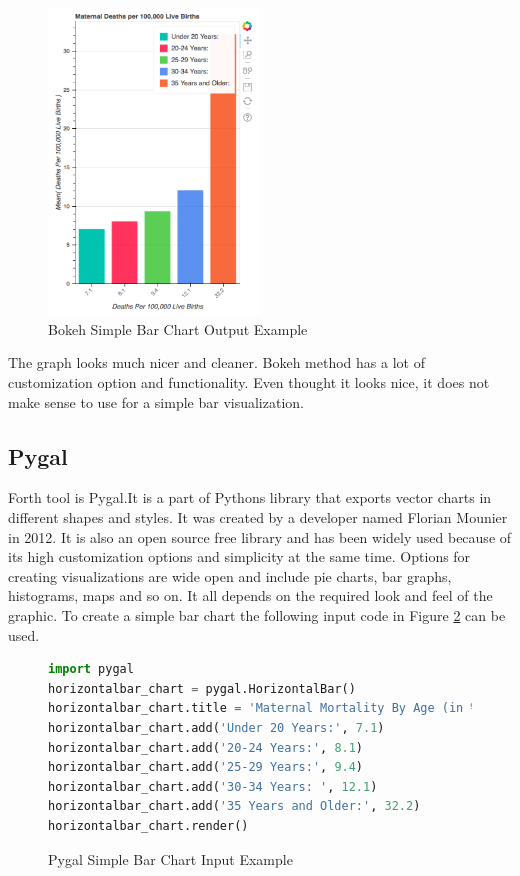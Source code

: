 \documentclass[sigconf]{acmart}
\begin{document}
\begin{figure}
  \centering
  \includegraphics[width=0.5\textwidth]{images/output_3_0.png}
  \caption{Bokeh Simple Bar Chart Output Example \cite{md}} \label{fig:figure6} 
\end{figure}

The graph looks much nicer and cleaner. Bokeh method has a lot of customization option and functionality. Even thought it looks nice, it does not make sense to use for a simple bar visualization. 

\subsection{Pygal}

Forth tool is Pygal.It is a part of Python\textquotesingle s library that exports vector charts in different shapes and styles. It was created by a developer named Florian Mounier in 2012. It is also an open source free library and has been widely used because of its high customization options and simplicity at the same time. Options for creating visualizations are wide open and include pie charts, bar graphs, histograms, maps and so on. It all depends on the required look and feel of the graphic. To create a simple bar chart the following input code in Figure  \ref{fig:figure7} \cite{md} can be used.

\begin{figure}
   \begin{lstlisting}[language=Python]
import pygal
horizontalbar_chart = pygal.HorizontalBar()
horizontalbar_chart.title = 'Maternal Mortality By Age (in %)'
horizontalbar_chart.add('Under 20 Years:', 7.1)
horizontalbar_chart.add('20-24 Years:', 8.1)
horizontalbar_chart.add('25-29 Years:', 9.4)
horizontalbar_chart.add('30-34 Years: ', 12.1)
horizontalbar_chart.add('35 Years and Older:', 32.2)
horizontalbar_chart.render()
\end{lstlisting}
\caption{Pygal Simple Bar Chart Input Example \cite{md}}
\label{fig:figure7}
\end{figure}
\end{document}
